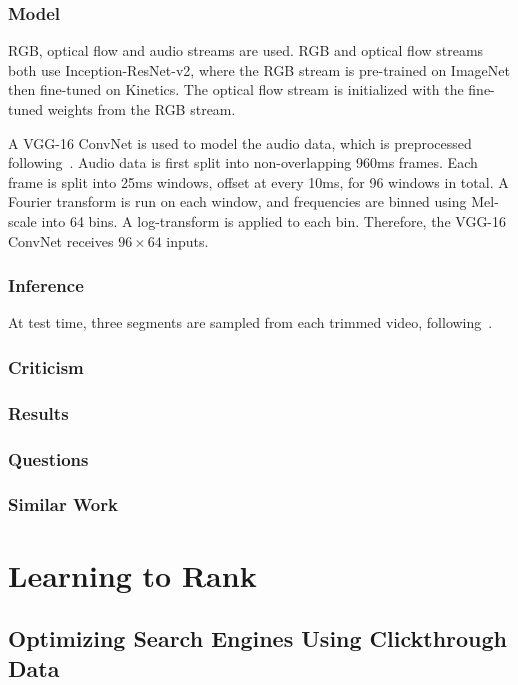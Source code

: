 \documentclass[a4paper, 12pt]{article}
\begin{document}
\subsubsection{Model}

RGB, optical flow and audio streams are used. RGB and optical flow streams both
use Inception-ResNet-v2, where the RGB stream is pre-trained on ImageNet then
fine-tuned on Kinetics. The optical flow stream is initialized with the
fine-tuned weights from the RGB stream.

A VGG-16 ConvNet is used to model the audio data, which is preprocessed
following~\citet{DBLP:journals/corr/HersheyCEGJMPPS16}. Audio data is first
split into non-overlapping 960ms frames. Each frame is split into 25ms windows,
offset at every 10ms, for 96 windows in total. A Fourier transform is run on
each window, and frequencies are binned using Mel-scale into 64 bins. A
log-transform is applied to each bin. Therefore, the VGG-16 ConvNet receives
$96 \times 64$ inputs.

\subsubsection{Inference}

At test time, three segments are sampled from each trimmed video,
following~\citet{DBLP:journals/corr/WangXW0LTG16}.

\subsubsection{Criticism}

\subsubsection{Results}

\subsubsection{Questions}

\subsubsection{Similar Work}


\section{Learning to Rank}


\subsection{Optimizing Search Engines Using Clickthrough
            Data~\cite{joachims-optimizing-2002}}
\end{document}
